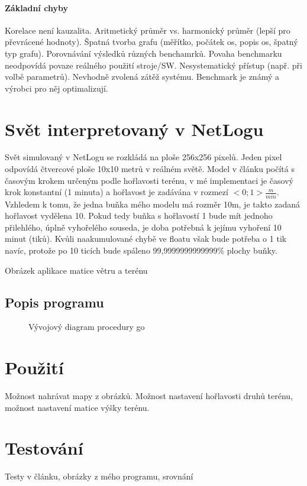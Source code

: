 \documentclass[11pt,a4paper]{scrartcl}
\begin{document}
	
	\paragraph{Základní chyby} Korelace není kauzalita. Aritmetický průměr vs. harmonický průměr (lepší pro převrácené hodnoty). Špatná tvorba grafu (měřítko, počátek os, popis os, špatný typ grafu). Porovnávání výsledků různých benchamrků. Povaha benchmarku neodpovídá povaze reálného použití stroje/SW. Nesystematický přístup (např. při volbě parametrů). Nevhodně zvolená zátěž systému. Benchmark je známý a výrobci pro něj optimalizují.
	
	\section{Svět interpretovaný v NetLogu}
	Svět simulovaný v NetLogu se rozkládá na ploše 256x256 pixelů. Jeden pixel odpovídá čtvercové ploše 10x10 metrů v reálném světě. Model v článku počítá s časovým krokem určeným podle hořlavosti terénu, v mé implementaci je časový krok konstantní (1 minuta) a hořlavost je zadávána v rozmezí $<0;1> \frac{m}{min}$. Vzhledem k tomu, že jedna buňka mého modelu má rozměr 10m, je takto zadaná hořlavost vydělena 10. Pokud tedy buňka s hořlavostí 1 bude mít jednoho přilehlého, úplně vyhořelého souseda, je doba potřebná k jejímu vyhoření 10 minut (tiků). Kvůli naakumulované chybě ve floatu však bude potřeba o 1 tik navíc, protože po 10 ticích bude spáleno 99,9999999999999\% plochy buňky.
	
	Obrázek aplikace matice větru a terénu
	
	\subsection{Popis programu}
	\begin{figure}
		\centering
		\caption{Vývojový diagram procedury go}
		\label{fig:go-procedure}
	\end{figure}
	
	
	\section{Použití}
	Možnost nahrávat mapy z obrázků. Možnost nastavení hořlavosti druhů terénu, možnost nastavení matice výšky terénu.
	
	\section{Testování}
	Testy v článku, obrázky z mého programu, srovnání
	
\end{document}
